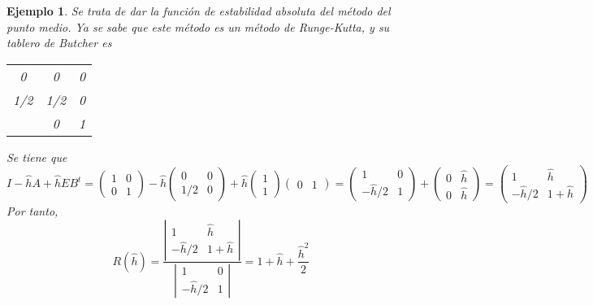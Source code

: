 \documentclass[11pt]{report}
\theoremstyle{mytheorem}
\theoremstyle{mydefinition}
\theoremstyle{myexample}
\newtheorem*{example}{Ejemplo}
\begin{document}
\begin{example}
Se trata de dar la función de estabilidad absoluta del método del punto medio. Ya se sabe que este método es un método de Runge-Kutta, y su tablero de Butcher es

\begin{center}
\setlength\extrarowheight{2.5pt}
\begin{tabular}{c|cc}
    0 & 0 & 0 \\
    1/2 & 1/2 & 0 \\ \hline
    & 0 & 1
\end{tabular}
\end{center}

Se tiene que
\[I-\hat{h}A+\hat{h}EB^t  = \left( \begin{array}{cc}
    1 & 0 \\
    0 & 1
\end{array} \right) - \hat{h} \left( \begin{array}{cc}
    0 & 0 \\
    1/2 & 0
\end{array} \right) + \hat{h} \left( \begin{array}{c}
1\\
1
\end{array} \right) \left( \begin{array}{cc}
0 & 1
\end{array} \right) = \left( \begin{array}{cc}
    1 & 0 \\
    -\hat{h}/2 & 1
\end{array} \right) + \left( \begin{array}{cc}
    0 & \hat{h} \\
    0 & \hat{h}
\end{array} \right) = \left( \begin{array}{cc}
    1 & \hat{h} \\
    -\hat{h}/2 & 1+\hat{h}
\end{array} \right)\]
Por tanto,
\[R(\hat{h}) = \frac{\left| \begin{array}{cc}
    1 & \hat{h} \\
    -\hat{h}/2 & 1+\hat{h}
\end{array} \right|}{\left|\begin{array}{cc}
    1 & 0 \\
    -\hat{h}/2 & 1
\end{array} \right|} =1+\hat{h}+\frac{\hat{h}^2}{2}\]
\end{example}
\end{document}
